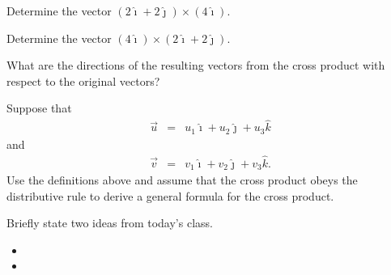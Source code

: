 \begin{problem}
\begin{subproblem}
    \clearpage

  \item Determine the vector $\left(2 \hat{\imath} + 2\hat{\jmath}\right) \times \left(4 \hat{\imath}\right)$.
    \vfill

  \item Determine the vector $\left( 4 \hat{\imath} \right)  \times  \left( 2 \hat{\imath} + 2\hat{\jmath}\right)$.
    \vfill

  \item What are the directions of the resulting vectors from the cross product with respect to the original vectors?
    \vspace{2em}

    \clearpage

  \item Suppose that
    \begin{eqnarray*}
      \vec{u} & = & u_1 \hat{\imath} + u_2 \hat{\jmath} + u_3 \hat{k}
    \end{eqnarray*}
    and
    \begin{eqnarray*}
      \vec{v} & = & v_1 \hat{\imath} + v_2 \hat{\jmath} + v_3 \hat{k}.
    \end{eqnarray*}
    Use the definitions above and assume that the cross product obeys
    the distributive rule to derive a general formula for the cross product.
    \vfill

  \end{subproblem}
\end{problem}


\postClass

\begin{problem}
\item Briefly state two ideas from today's class.
  \begin{itemize}
  \item
  \item
  \end{itemize}
\item
  \begin{subproblem}
    \item
  \end{subproblem}
\end{problem}


